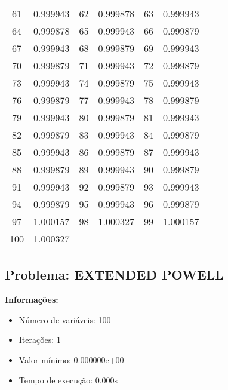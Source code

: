 \documentclass[12pt]{article}
\begin{document}
\begin{longtable}{@{}cc|cc|cc@{}}
61 & 0.999943 & 62 & 0.999878 & 63 & 0.999943 \\
64 & 0.999878 & 65 & 0.999943 & 66 & 0.999879 \\
67 & 0.999943 & 68 & 0.999879 & 69 & 0.999943 \\
70 & 0.999879 & 71 & 0.999943 & 72 & 0.999879 \\
73 & 0.999943 & 74 & 0.999879 & 75 & 0.999943 \\
76 & 0.999879 & 77 & 0.999943 & 78 & 0.999879 \\
79 & 0.999943 & 80 & 0.999879 & 81 & 0.999943 \\
82 & 0.999879 & 83 & 0.999943 & 84 & 0.999879 \\
85 & 0.999943 & 86 & 0.999879 & 87 & 0.999943 \\
88 & 0.999879 & 89 & 0.999943 & 90 & 0.999879 \\
91 & 0.999943 & 92 & 0.999879 & 93 & 0.999943 \\
94 & 0.999879 & 95 & 0.999943 & 96 & 0.999879 \\
97 & 1.000157 & 98 & 1.000327 & 99 & 1.000157 \\
100 & 1.000327 &  &  &  &  \\

\end{longtable}


\newpage            
\subsection{Problema: EXTENDED POWELL}

\textbf{Informações:}
\begin{itemize}
\item Número de variáveis: 100
\item Iterações: 1
\item Valor mínimo: 0.000000e+00
\item Tempo de execução: 0.000s
\end{itemize}
\end{document}

